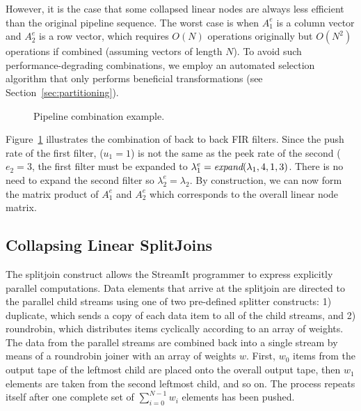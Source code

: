 {However, it is the case that some collapsed linear nodes are always
less efficient than the original pipeline sequence.  The worst case is
when $A_1^e$ is a column vector and $A_2^e$ is a row vector, which
requires $O(N)$ operations originally but $O(N^2)$ operations if
combined (assuming vectors of length $N$).  To avoid such
performance-degrading combinations, we employ an automated selection
algorithm that only performs beneficial transformations (see
Section~\ref{sec:partitioning}).

\begin{figure}[t]
\begin{center}
\vspace{-6pt}
\caption{Pipeline combination example.}
\label{fig:example-pipeline-combination}
\end{center}
\vspace{-22pt}
\makeline
\vspace{-14pt}
\end{figure}

Figure~\ref{fig:example-pipeline-combination} illustrates the 
combination of back to back FIR filters. Since
the push rate of the first filter, ($u_1=1$) is not the same as
the peek rate of the second ($e_2=3$, the first filter
must be expanded to $\lambda_1^e = \mbox{\it expand}(\lambda_1,4,1,3)$.
There is no need to expand the second filter so 
$\lambda_2^e = \lambda_2$. By construction, we can now form the
matrix product of $A_1^e$ and $A_2^e$ which corresponds to the
overall linear node matrix.

\subsection{Collapsing Linear SplitJoins}

The splitjoin construct allows the StreamIt programmer to
express explicitly parallel computations.  Data elements that arrive
at the splitjoin are directed to the parallel child streams
using one of two pre-defined splitter constructs: 1) duplicate,
which sends a copy of each data item to all of the child streams, and
2) roundrobin, which distributes items cyclically according to an
array of weights.  The data from the parallel streams are
combined back into a single stream by means of a roundrobin 
joiner with an array of weights $w$.  First, $w_0$ items from the
output tape of the leftmost child are placed onto the overall output
tape, then $w_1$ elements are taken from the second leftmost child,
and so on.  The process repeats itself after one complete set of
$\sum_{i=0}^{N-1} w_i$ elements has been pushed.

}
